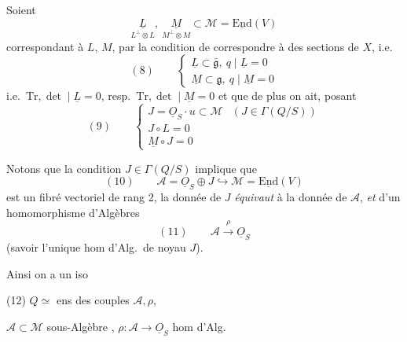 \documentclass[11pt,a4paper]{article}
\begin{document}
Soient \struck{\ill{}}
\[
  \underset{L^{\perp} \otimes L}{\underline{L}}, \ \underset{M^{\perp} \otimes M}{\underline{M}} \subset \mathcal{M} = \underline{\mathrm{End}}(V)
\]
correspondant à $L$, $M$,  par la condition de
correspondre à des sections de $X$, i.e.
\[
  (8) \qquad
  \begin{cases}
    \underline{L} \subset \bar{\mathfrak{g}}, \ q \mid \underline{L} = 0 \\
    \underline{M} \subset \mathfrak{g}, \ q \mid \underline{M} = 0
  \end{cases}
\]
i.e.\ $\mathrm{Tr}, \det \mid \underline{L} = 0$, resp.\ $\mathrm{Tr}, \det \mid \underline{M} = 0$
et que de plus on ait, posant
\[
  (9) \qquad
  \begin{cases}
    J = \underline{O}_S \cdot u \subset \mathcal{M} & (J \in \Gamma(Q/S)) \\
    J \circ L = 0 \\
    \underline{M} \circ J = 0
  \end{cases}
\]

Notons que la condition $J \in \Gamma(Q/S)$ implique que
\[
  (10) \qquad \mathcal{A} = \underline{O}_S \oplus J \hookrightarrow \mathcal{M} = \underline{\mathrm{End}}(V)
\]
est un fibré vectoriel de rang 2, \struck{\ill{}} la donnée de $J$
\emph{équivaut} à la donnée \struck{\ill{}} de $\mathcal{A}$, \emph{et} d'un
homomorphisme d'Algèbres
\[
  (11) \qquad \mathcal{A} \xrightarrow{\ \rho\ } \underline{O}_S
\]
(savoir l'unique hom d'Alg.\ de noyau $J$).

Ainsi on a un iso

(12) \quad $Q \simeq$ ens des couples $\mathcal{A}, \rho$,

$\mathcal{A} \subset \mathcal{M}$ sous-Algèbre \struck{\ill{}} ,
$\rho : \mathcal{A} \to \underline{O}_S$ hom d'Alg.
\end{document}
